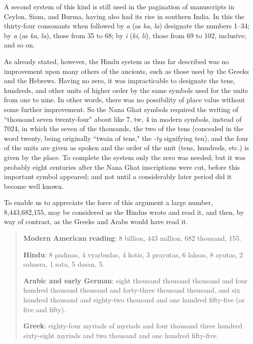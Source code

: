 \documentclass[11pt,a4paper]{article}
\begin{document}
A second system of this kind is still used in the pagination of manuscripts in Ceylon, Siam, and Burma, having also had its rise in southern India. In this the thirty-four consonants when followed by \textit{a} (as \textit{ka}, \textit{la}) designate the numbers 1--34; by \textit{a} (as \textit{ka}, \textit{la}), those from 35 to 68; by \textit{i} (\textit{ki}, \textit{li}), those from 69 to 102, inclusive; and so on.

As already stated, however, the Hindu system as thus far described was no improvement upon many others of the ancients, such as those used by the Greeks and the Hebrews. Having no zero, it was impracticable to designate the tens, hundreds, and other units of higher order by the same symbols used for the units from one to nine. In other words, there was no possibility of place value without some further improvement. So the Nana Ghat symbols required the writing of ``thousand seven twenty-four" about like 7, tw, 4 in modern symbols, instead of 7024, in which the seven of the thousands, the two of the tens (concealed in the word twenty, being originally ``twain of tens," the \textit{-ty} signifying ten), and the four of the units are given as spoken and the order of the unit (tens, hundreds, etc.) is given by the place. To complete the system only the zero was needed; but it was probably eight centuries after the Nana Ghat inscriptions were cut, before this important symbol appeared; and not until a considerably later period did it become well known.

To enable us to appreciate the force of this argument a large number, 8,443,682,155, may be considered as the Hindus wrote and read it, and then, by way of contrast, as the Greeks and Arabs would have read it.

\begin{quote}
\textbf{Modern American reading}: 8 billion, 443 million, 682 thousand, 155.

\smallskip
\textbf{Hindu}: 8 padmas, 4 vyarbudas, 4 kotis, 3 prayutas, 6 laksas, 8 ayutas, 2 sahasra, 1 sata, 5 dasan, 5.

\smallskip
\textbf{Arabic and early German}: eight thousand thousand thousand and four hundred thousand thousand and forty-three thousand thousand, and six hundred thousand and eighty-two thousand and one hundred fifty-five (or five and fifty).

\smallskip
\textbf{Greek}: eighty-four myriads of myriads and four thousand three hundred sixty-eight myriads and two thousand and one hundred fifty-five.
\end{quote}
\end{document}
